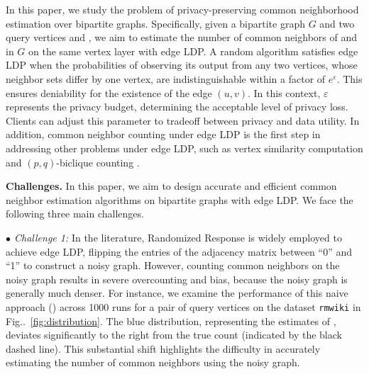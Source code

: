 In this paper, we study the problem of privacy-preserving common neighborhood estimation over bipartite graphs. Specifically, given a bipartite graph $G$ and two query vertices \vq and \vx, we aim to estimate the number of common neighbors of \vq and \vx in $G$ on the same vertex layer with edge LDP. 
A random algorithm satisfies edge LDP when the probabilities of observing its output from any two vertices, whose neighbor sets differ by one vertex, are indistinguishable within a factor of $e^{\varepsilon}$. This ensures deniability for the existence of the edge $(u,v)$.
In this context, $\varepsilon$ represents the privacy budget, determining the acceptable level of privacy loss. Clients can adjust this parameter to tradeoff between privacy and data utility. 
{
In addition, common neighbor counting under edge LDP is the first step in addressing other problems under edge LDP, such as vertex similarity computation \cite{leicht2006vertex} and $(p,q)$-biclique counting \cite{yang2023p}. 
}


\noindent
{\bf Challenges.} 
In this paper, we aim to design accurate and efficient common neighbor estimation algorithms on bipartite graphs with edge LDP. We face the following three main challenges. 

\noindent 
{\em $\bullet$ Challenge 1:} 
In the literature, Randomized Response \cite{warner1965randomized} is widely employed to achieve edge LDP, flipping the entries of the adjacency matrix between ``0'' and ``1'' to construct a noisy graph. However, counting common neighbors on the noisy graph results in severe overcounting and bias, because the noisy graph is generally much denser. For instance, we examine the performance of this naive approach (\naive) across 1000 runs for a pair of query vertices on the dataset \texttt{rmwiki} in Fig..~\ref{fig:distribution}. 
The blue distribution, representing the estimates of \naive, deviates significantly to the right from the true count (indicated by the black dashed line). This substantial shift highlights the difficulty in accurately estimating the number of common neighbors using the noisy graph. 



